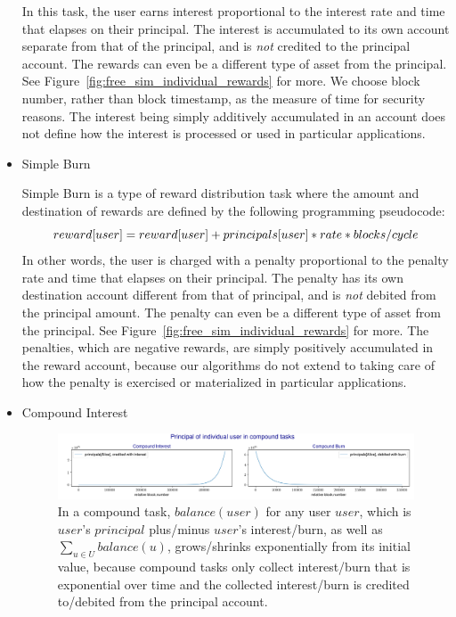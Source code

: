 \documentclass{article}
\begin{document}
\begin{itemize}
    In this task, the user earns interest proportional to the interest rate and time 
    that elapses on their principal.
    The interest is accumulated to its own account separate from that of the principal, 
    and is \textit{not} credited to the principal account.
    The rewards can even be a different type of asset from the principal. 
    See Figure~\ref{fig:free_sim_individual_rewards} for more.
    We choose block number, rather than block timestamp, as the measure of 
    time for security reasons. The interest being simply additively accumulated in an account 
    does not define how the interest is processed or used in particular applications.

  \item Simple Burn
  \label{sec:SimpleBurn}

  Simple Burn is a type of reward distribution task where the amount 
  and destination of rewards are defined by the following programming pseudocode:
  \begin{equation}  \label{eq:SimpleBurn}
  \\reward[user] = reward[user] + principals[user] * rate * blocks / cycle
  \end{equation}
  In other words, the user is charged with a penalty proportional to the penalty rate 
  and time that elapses on their principal.
  The penalty has its own destination account different from that of principal, and 
  is \textit{not} debited from the principal amount.
  The penalty can even be a different type of asset from the principal. 
  See Figure~\ref{fig:free_sim_individual_rewards} for more.
  The penalties, which are negative rewards, are simply 
  positively accumulated in the reward account, because our algorithms do not 
  extend to taking care of how the penalty is exercised or materialized in particular 
  applications.
    
  \item Compound Interest

  \begin{figure}[H]
    \centering
    \includegraphics[width=5.3in]{images/_6.3_free_com_individual_principals.jpg}
    \caption{In a compound task,
    $balance(user)$ for any user $user$, which is $user$'s $principal$ plus/minus 
    $user$'s interest/burn, as well as $\sum_{u \in U}balance(u)$, 
    grows/shrinks exponentially from its initial value, because compound tasks 
    only collect interest/burn that is exponential over time and the collected 
    interest/burn is credited to/debited from the principal account.
    }
    \label{fig:free_com_individual_principals}
  \end{figure}


\end{itemize}
\end{document}
